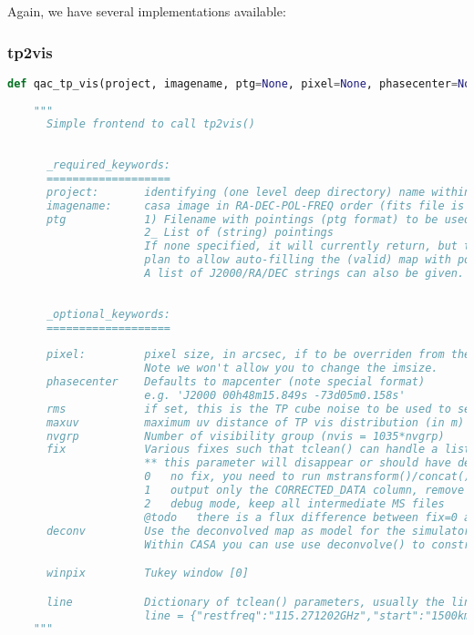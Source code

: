 \documentclass[12pt,a4paper]{article}
\begin{document}
Again, we have several implementations available:

\subsubsection{tp2vis}

\begin{lstlisting}[language=Python]
def qac_tp_vis(project, imagename, ptg=None, pixel=None, phasecenter=None, rms=None, maxuv=10.0, nvgrp=4, fix=1, deconv=True, winpix=0, **line):    
           
    """
      Simple frontend to call tp2vis() 
    
    
      _required_keywords:
      ===================
      project:       identifying (one level deep directory) name within which all files are places
      imagename:     casa image in RA-DEC-POL-FREQ order (fits file is ok too)
      ptg            1) Filename with pointings (ptg format) to be used
                     2_ List of (string) pointings
                     If none specified, it will currently return, but there may be a
                     plan to allow auto-filling the (valid) map with pointings.
                     A list of J2000/RA/DEC strings can also be given.
    
    
      _optional_keywords:
      ===================
    
      pixel:         pixel size, in arcsec, if to be overriden from the input map. Default: None
                     Note we won't allow you to change the imsize.
      phasecenter    Defaults to mapcenter (note special format)
                     e.g. 'J2000 00h48m15.849s -73d05m0.158s'
      rms            if set, this is the TP cube noise to be used to set the weights
      maxuv          maximum uv distance of TP vis distribution (in m)  [10m] 
      nvgrp          Number of visibility group (nvis = 1035*nvgrp)
      fix            Various fixes such that tclean() can handle a list of ms.
                     ** this parameter will disappear or should have default 1
                     0   no fix, you need to run mstransform()/concat() on the tp.ms
                     1   output only the CORRECTED_DATA column, remove other *DATA*, POINTING table also removed
                     2   debug mode, keep all intermediate MS files
                     @todo   there is a flux difference between fix=0 and fix=1 in dirtymap
      deconv         Use the deconvolved map as model for the simulator
                     Within CASA you can use use deconvolve() to construct a Jy/pixel map.

      winpix         Tukey window [0]

      line           Dictionary of tclean() parameters, usually the line parameters are useful, e.g.
                     line = {"restfreq":"115.271202GHz","start":"1500km/s", "width":"5km/s","nchan":5}
    """
\end{lstlisting}
\end{document}
